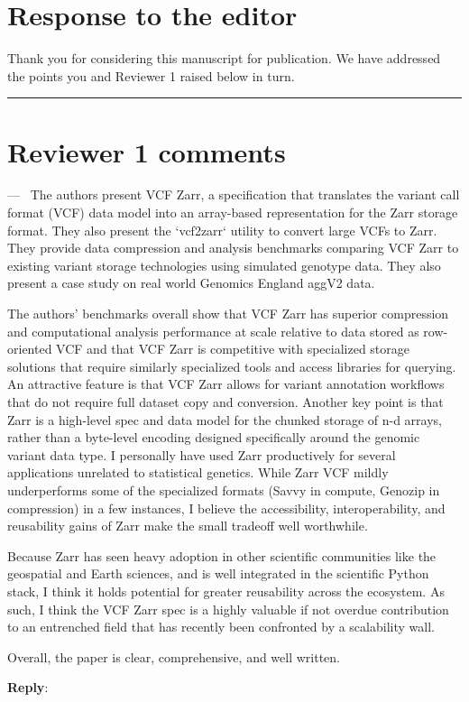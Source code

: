 \documentclass[11pt]{article}
\newcounter{reviewer}
\newcounter{point}[reviewer]
\renewcommand{\thepoint}{\thereviewer.\arabic{point}}
\newcommand{\reviewersection}{\stepcounter{reviewer} \bigskip \hrule}
\newenvironment{point}
   {\refstepcounter{point} \bigskip \noindent {\textbf{Point~\thepoint} } ---\ }
   {\par }
\newenvironment{reply}
   {\medskip \noindent \begin{sf}\textbf{Reply}:\  }
   {\medskip \end{sf}}
\begin{document}
\section*{Response to the editor}
Thank you for considering this manuscript for publication.  We have addressed
the points you and Reviewer 1 raised below in turn.

\reviewersection
\section*{Reviewer 1 comments}

\begin{point}
The authors present VCF Zarr, a specification that translates the variant call
format (VCF) data model into an array-based representation for the Zarr storage
format. They also present the `vcf2zarr` utility to convert large VCFs to Zarr.
They provide data compression and analysis benchmarks comparing VCF Zarr to
existing variant storage technologies using simulated genotype data. They also
present a case study on real world Genomics England aggV2 data.

The authors' benchmarks overall show that VCF Zarr has superior compression and
computational analysis performance at scale relative to data stored as
row-oriented VCF and that VCF Zarr is competitive with specialized storage
solutions that require similarly specialized tools and access libraries for
querying. An attractive feature is that VCF Zarr allows for variant annotation
workflows that do not require full dataset copy and conversion. Another key
point is that Zarr is a high-level spec and data model for the chunked storage
of n-d arrays, rather than a byte-level encoding designed specifically around
the genomic variant data type. I personally have used Zarr productively for
several applications unrelated to statistical genetics. While Zarr VCF mildly
underperforms some of the specialized formats (Savvy in compute, Genozip in
compression) in a few instances, I believe the accessibility, interoperability,
and reusability gains of Zarr make the small tradeoff well worthwhile. 

Because Zarr has seen heavy adoption in other scientific communities like the
geospatial and Earth sciences, and is well integrated in the scientific Python
stack, I think it holds potential for greater reusability across the ecosystem.
As such, I think the VCF Zarr spec is a highly valuable if not overdue
contribution to an entrenched field that has recently been confronted by a
scalability wall.

Overall, the paper is clear, comprehensive, and well written. 
\end{point}
\begin{reply}
\end{reply}
\end{document}
